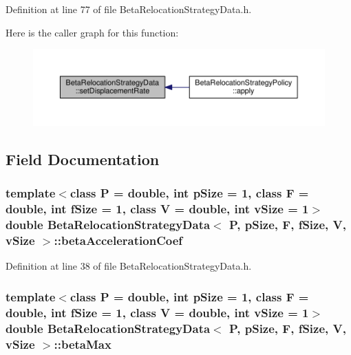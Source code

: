 Definition at line 77 of file Beta\+Relocation\+Strategy\+Data.\+h.



Here is the caller graph for this function\+:
\nopagebreak
\begin{figure}[H]
\begin{center}
\leavevmode
\includegraphics[width=350pt]{structBetaRelocationStrategyData_a542d95263cbcd95c32b43f31881331a5_icgraph}
\end{center}
\end{figure}




\subsection{Field Documentation}
\subsubsection[{\texorpdfstring{beta\+Acceleration\+Coef}{betaAccelerationCoef}}]{\setlength{\rightskip}{0pt plus 5cm}template$<$class P = double, int p\+Size = 1, class F = double, int f\+Size = 1, class V = double, int v\+Size = 1$>$ double {\bf Beta\+Relocation\+Strategy\+Data}$<$ P, p\+Size, F, f\+Size, V, v\+Size $>$\+::beta\+Acceleration\+Coef}\hypertarget{structBetaRelocationStrategyData_a957ba3439a50f2dadf2e500ac0cfcd3c}{}\label{structBetaRelocationStrategyData_a957ba3439a50f2dadf2e500ac0cfcd3c}


Definition at line 38 of file Beta\+Relocation\+Strategy\+Data.\+h.

\subsubsection[{\texorpdfstring{beta\+Max}{betaMax}}]{\setlength{\rightskip}{0pt plus 5cm}template$<$class P = double, int p\+Size = 1, class F = double, int f\+Size = 1, class V = double, int v\+Size = 1$>$ double {\bf Beta\+Relocation\+Strategy\+Data}$<$ P, p\+Size, F, f\+Size, V, v\+Size $>$\+::beta\+Max}\hypertarget{structBetaRelocationStrategyData_acfd06a41587b792b0f85807fe800b46a}{}\label{structBetaRelocationStrategyData_acfd06a41587b792b0f85807fe800b46a}


